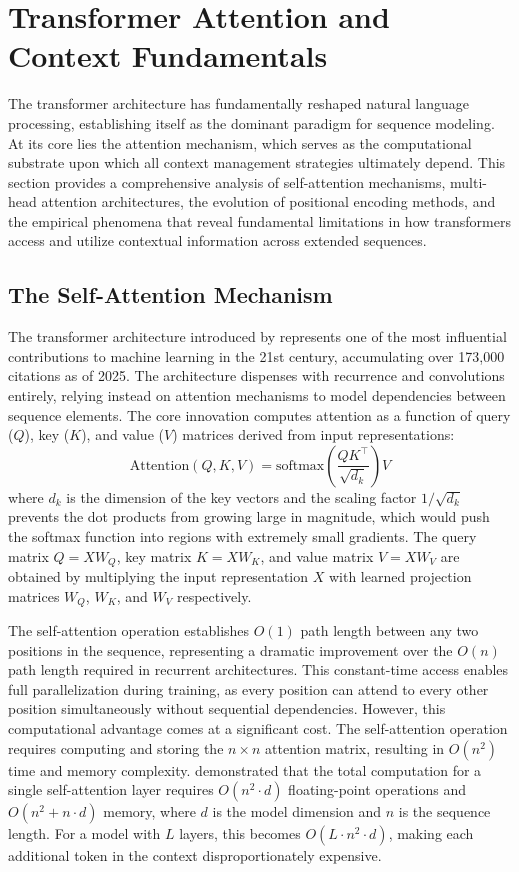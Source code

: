 \section{Transformer Attention and Context Fundamentals}
\label{sec:attention}

The transformer architecture has fundamentally reshaped natural language processing, establishing itself as the dominant paradigm for sequence modeling. At its core lies the attention mechanism, which serves as the computational substrate upon which all context management strategies ultimately depend. This section provides a comprehensive analysis of self-attention mechanisms, multi-head attention architectures, the evolution of positional encoding methods, and the empirical phenomena that reveal fundamental limitations in how transformers access and utilize contextual information across extended sequences.

\subsection{The Self-Attention Mechanism}

The transformer architecture introduced by \citet{vaswani2017attention} represents one of the most influential contributions to machine learning in the 21st century, accumulating over 173,000 citations as of 2025. The architecture dispenses with recurrence and convolutions entirely, relying instead on attention mechanisms to model dependencies between sequence elements. The core innovation computes attention as a function of query ($Q$), key ($K$), and value ($V$) matrices derived from input representations:
\begin{equation}
\text{Attention}(Q, K, V) = \text{softmax}\left(\frac{QK^\top}{\sqrt{d_k}}\right)V
\end{equation}
where $d_k$ is the dimension of the key vectors and the scaling factor $1/\sqrt{d_k}$ prevents the dot products from growing large in magnitude, which would push the softmax function into regions with extremely small gradients. The query matrix $Q = XW_Q$, key matrix $K = XW_K$, and value matrix $V = XW_V$ are obtained by multiplying the input representation $X$ with learned projection matrices $W_Q$, $W_K$, and $W_V$ respectively.

The self-attention operation establishes $O(1)$ path length between any two positions in the sequence, representing a dramatic improvement over the $O(n)$ path length required in recurrent architectures. This constant-time access enables full parallelization during training, as every position can attend to every other position simultaneously without sequential dependencies. However, this computational advantage comes at a significant cost. The self-attention operation requires computing and storing the $n \times n$ attention matrix, resulting in $O(n^2)$ time and memory complexity. \citet{vaswani2017attention} demonstrated that the total computation for a single self-attention layer requires $O(n^2 \cdot d)$ floating-point operations and $O(n^2 + n \cdot d)$ memory, where $d$ is the model dimension and $n$ is the sequence length. For a model with $L$ layers, this becomes $O(L \cdot n^2 \cdot d)$, making each additional token in the context disproportionately expensive.

